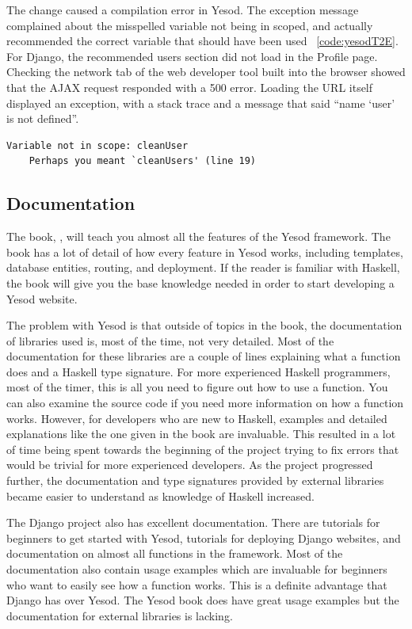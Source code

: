 The change caused a compilation error in Yesod. The exception message complained
about the misspelled variable not being in scoped, and actually recommended the
correct variable that should have been used ~\ref{code:yesodT2E}.
For Django, the recommended users section did not load in the Profile page.
Checking the network tab of the web developer tool built into the browser
showed that the AJAX request responded with a 500 error. Loading the URL
itself displayed an exception, with a stack trace and a message that said 
``name `user' is not defined''.

\begin{lstlisting}[caption={Yesod Exception Message},label={code:yesodT2E}]
	Variable not in scope: cleanUser
	Perhaps you meant `cleanUsers' (line 19)
\end{lstlisting}

\subsection{Documentation}

The book, , will teach you almost all the features of the
Yesod framework. The book has a lot of detail of how every feature in Yesod works,
including templates, database entities, routing, and deployment. If the reader
is familiar with Haskell, the book will give you the base knowledge needed
in order to start developing a Yesod website.

The problem with Yesod is that outside of topics in the book, the documentation
of libraries used is, most of the time, not very detailed. Most of the documentation
for these libraries are a couple of lines explaining what a function does and
a Haskell type signature. For more experienced Haskell programmers, most of the
timer, this is all you need to figure out how to use a function. You can also
examine the source code if you need more information on how a function works.
However, for developers who are new to Haskell, examples and detailed explanations
like the one given in the book are invaluable. This resulted in a lot of time
being spent towards the beginning of the project trying to fix errors that would be
trivial for more experienced developers. As the project progressed further, the 
documentation and type signatures provided by external libraries became easier to 
understand as knowledge of Haskell increased.

The Django project also has excellent documentation. There are tutorials for
beginners to get started with Yesod, tutorials for deploying Django websites,
and documentation on almost all functions in the framework. Most of the
documentation also contain usage examples which are invaluable for
beginners who want to easily see how a function works. This is a definite
advantage that Django has over Yesod. The Yesod book does have great
usage examples but the documentation for external libraries is lacking.


